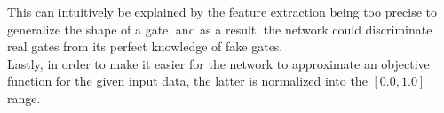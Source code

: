 This can intuitively be explained by the feature extraction being too precise
to generalize the shape of a gate, and as a result, the network could
discriminate real gates from its perfect knowledge of fake gates.\\

Lastly, in order to make it easier for the network to approximate an objective
function for the given input data, the latter is normalized into the $[0.0,1.0]$
range.
